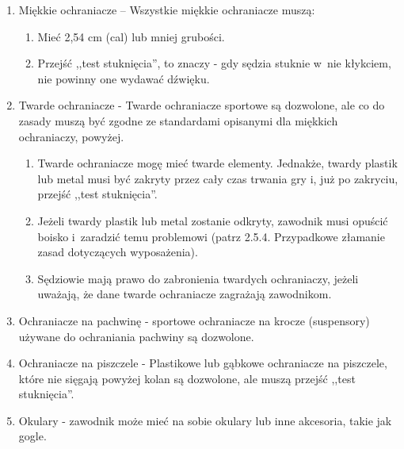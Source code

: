 \documentclass[12pt,a4paper]{article}
\begin{document}
\begin{enumerate}
	\item
	      Miękkie ochraniacze -- Wszystkie miękkie ochraniacze muszą:

	      \begin{enumerate}
		      \item
		            Mieć 2,54 cm (cal) lub mniej grubości.
		      \item
		            Przejść ,,test stuknięcia'', to znaczy - gdy sędzia stuknie w~nie
		            kłykciem, nie powinny one wydawać dźwięku.
	      \end{enumerate}
	\item
	      Twarde ochraniacze - Twarde ochraniacze sportowe są
	      dozwolone, ale co do zasady muszą być zgodne ze standardami opisanymi
	      dla miękkich ochraniaczy, powyżej.

	      \begin{enumerate}
		      \item
		            Twarde ochraniacze mogę mieć twarde elementy. Jednakże, twardy
		            plastik lub metal musi być zakryty przez cały czas trwania gry i,
		            już po zakryciu, przejść ,,test stuknięcia''.
		      \item
		            Jeżeli twardy plastik lub metal zostanie odkryty, zawodnik musi
		            opuścić boisko i~zaradzić temu problemowi (patrz 2.5.4. Przypadkowe
		            złamanie zasad dotyczących wyposażenia).
		      \item
		            Sędziowie mają prawo do zabronienia twardych ochraniaczy, jeżeli
		            uważają, że dane twarde ochraniacze zagrażają zawodnikom.
	      \end{enumerate}
	\item
	      Ochraniacze na pachwinę - sportowe ochraniacze na krocze
	      (suspensory) używane do ochraniania pachwiny są dozwolone.
	\item
	      Ochraniacze na piszczele - Plastikowe lub gąbkowe ochraniacze na
	      piszczele, które nie sięgają powyżej kolan są dozwolone, ale muszą przejść
	      ,,test stuknięcia''.
	\item
	      Okulary - zawodnik może mieć na sobie okulary lub inne
	      akcesoria, takie jak gogle.


\end{enumerate}
\end{document}
